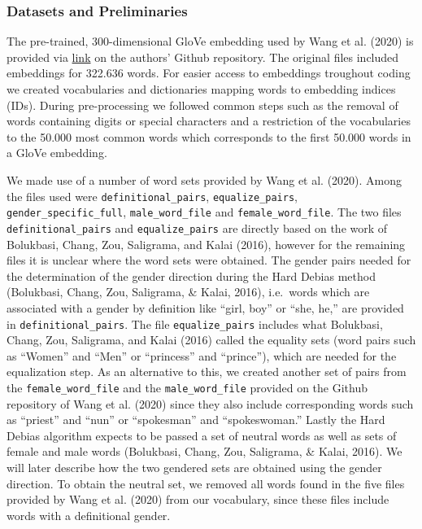 \documentclass[
  english,
  man,floatsintext]{apa6}
\begin{document}
\hypertarget{datasets-and-preliminaries}{%
\subsubsection{Datasets and Preliminaries}\label{datasets-and-preliminaries}}

The pre-trained, 300-dimensional GloVe embedding used by Wang et al. (2020) is provided via \href{http://www.cs.virginia.edu/~tw8cb/word_embeddings/}{link} on the authors' Github repository. The original files included embeddings for 322.636 words. For easier access to embeddings troughout coding we created vocabularies and dictionaries mapping words to embedding indices (IDs). During pre-processing we followed common steps such as the removal of words containing digits or special characters and a restriction of the vocabularies to the 50.000 most common words which corresponds to the first 50.000 words in a GloVe embedding.

We made use of a number of word sets provided by Wang et al. (2020). Among the files used were \texttt{definitional\_pairs}, \texttt{equalize\_pairs}, \texttt{gender\_specific\_full}, \texttt{male\_word\_file} and \texttt{female\_word\_file}. The two files \texttt{definitional\_pairs} and \texttt{equalize\_pairs} are directly based on the work of Bolukbasi, Chang, Zou, Saligrama, and Kalai (2016), however for the remaining files it is unclear where the word sets were obtained. The gender pairs needed for the determination of the gender direction during the Hard Debias method (Bolukbasi, Chang, Zou, Saligrama, \& Kalai, 2016), i.e.~words which are associated with a gender by definition like ``girl, boy'' or ``she, he,'' are provided in \texttt{definitional\_pairs}. The file \texttt{equalize\_pairs} includes what Bolukbasi, Chang, Zou, Saligrama, and Kalai (2016) called the equality sets (word pairs such as ``Women'' and ``Men'' or ``princess'' and ``prince''), which are needed for the equalization step. As an alternative to this, we created another set of pairs from the \texttt{female\_word\_file} and the \texttt{male\_word\_file} provided on the Github repository of Wang et al. (2020) since they also include corresponding words such as ``priest'' and ``nun'' or ``spokesman'' and ``spokeswoman.'' Lastly the Hard Debias algorithm expects to be passed a set of neutral words as well as sets of female and male words (Bolukbasi, Chang, Zou, Saligrama, \& Kalai, 2016). We will later describe how the two gendered sets are obtained using the gender direction. To obtain the neutral set, we removed all words found in the five files provided by Wang et al. (2020) from our vocabulary, since these files include words with a definitional gender.
\end{document}
